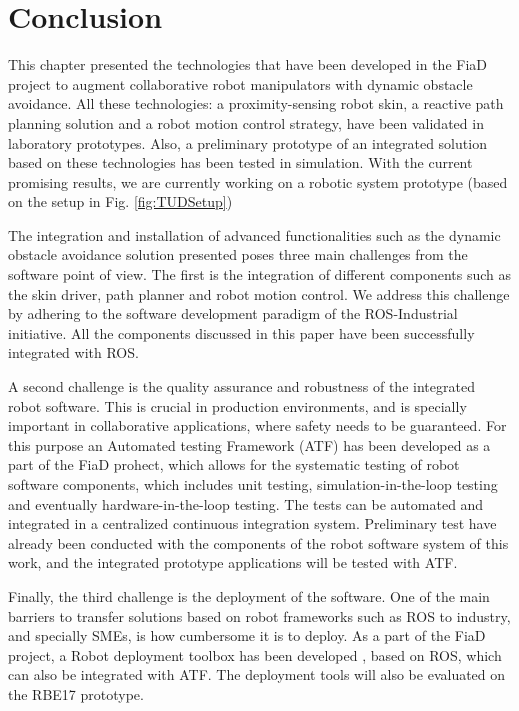 \section{Conclusion}

This chapter presented the technologies that have been developed in the FiaD
project to augment collaborative robot manipulators with dynamic obstacle
avoidance. All these technologies: a proximity-sensing robot skin, a reactive
path planning solution and a robot motion control strategy, have been validated
in laboratory prototypes. Also, a preliminary prototype of an integrated
solution based on these technologies has been tested in simulation. With the current promising results, we are currently working on a robotic system prototype (based on the setup in Fig. \ref{fig:TUDSetup})

The integration and installation of advanced functionalities such as the dynamic
obstacle avoidance solution presented poses three main challenges from the
software point of view. The first is the integration of different components such as the skin driver, path planner and robot motion control. We address this challenge by adhering to the software development paradigm of the ROS-Industrial initiative. All the components discussed in this paper have been successfully integrated with ROS.

A second challenge is the quality assurance and robustness of the integrated robot software. This is crucial in production environments, and is specially important in collaborative applications, where safety needs to be guaranteed. For this purpose an Automated testing Framework (ATF) has been developed \cite{Weisshardt-2016} as a part of the FiaD prohect, which
allows for the systematic testing of robot software components, which includes unit
 testing, simulation-in-the-loop testing and eventually hardware-in-the-loop testing.
The tests can be automated and integrated in a centralized continuous
integration system. Preliminary test have already been conducted with the
components of the robot software system of this work, and the integrated
prototype applications will be tested with ATF.

Finally, the third challenge is the deployment of the software. One of the main barriers to transfer solutions based on robot frameworks such as ROS to industry, and specially SMEs, is how cumbersome it is
to deploy. As a part of the FiaD project, a Robot deployment toolbox has been developed \cite{Ludtke-2017}, based on ROS, which can also be integrated with ATF.
The deployment tools will also be evaluated on the RBE17 prototype.


